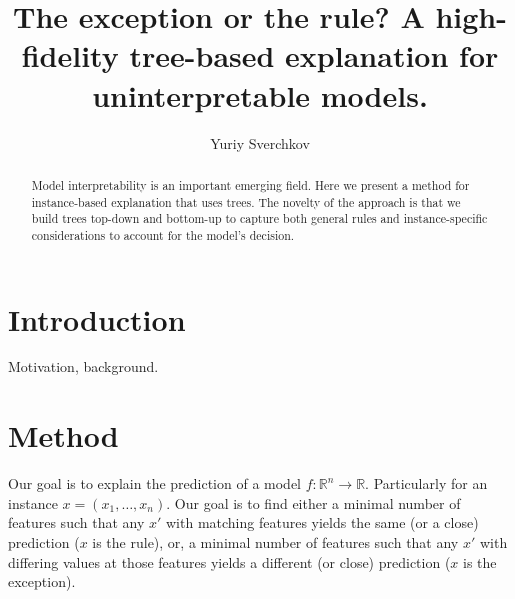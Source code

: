 \documentclass{article}
\title{The exception or the rule? A high-fidelity tree-based explanation for uninterpretable models.}
\author{Yuriy Sverchkov}
\begin{document}
	\begin{abstract}
		Model interpretability is an important emerging field.
		Here we present a method for instance-based explanation that uses trees.
		The novelty of the approach is that we build trees top-down and bottom-up to
		capture both general rules and instance-specific considerations to account for
		the model's decision.
	\end{abstract}
\section{Introduction}
Motivation, background.
\section{Method}
Our goal is to explain the prediction of a model $f: \mathbb R^n \rightarrow \mathbb R$.
Particularly for an instance $x= (x_1,\ldots, x_n)$.
Our goal is to find either a minimal number of features such that any $x'$ with matching features yields the same (or a close) prediction ($x$ is the rule), or, a minimal number of features such that any $x'$ with differing values at those features yields a different (or close) prediction ($x$ is the exception).
\end{document}
